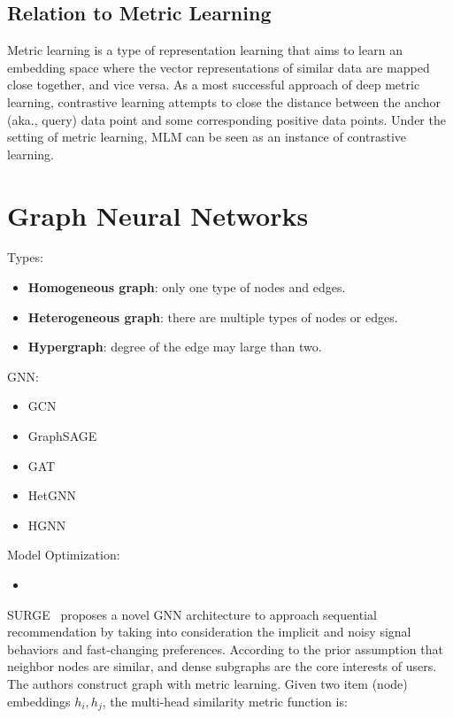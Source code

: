 \subsection{Relation to Metric Learning}

Metric learning is a type of representation learning that aims to learn an embedding space where the vector representations of similar data are mapped close together, and vice versa.
As a most successful approach of deep metric learning, contrastive learning attempts to close the distance between the anchor (aka., query) data point and some corresponding positive data points.
Under the setting of metric learning, MLM can be seen as an instance of contrastive learning.

\section{Graph Neural Networks}

Types:

\begin{itemize}
	\item \textbf{Homogeneous graph}: only one type of nodes and edges.
	\item \textbf{Heterogeneous graph}: there are multiple types of nodes or edges.
	\item \textbf{Hypergraph}: degree of the edge may large than two.
\end{itemize}

GNN:

\begin{itemize}
	\item GCN
	\item GraphSAGE
	\item GAT
	\item HetGNN
	\item HGNN
\end{itemize}

Model Optimization:

\begin{itemize}
	\item 
\end{itemize}

SURGE~ proposes a novel GNN architecture to approach sequential recommendation by taking into consideration the implicit and noisy signal behaviors and fast-changing preferences.
According to the prior assumption that neighbor nodes are similar, and dense subgraphs are the core interests of users.
The authors construct graph with metric learning.
Given two item (node) embeddings $h_i, h_j$, the multi-head similarity metric function is:

